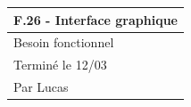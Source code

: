 \documentclass[a4paper,12pt]{article}
\begin{document}
\noindent
\setlength{\arrayrulewidth}{1.5pt}
\renewcommand{\arraystretch}{1.5}
\begin{tabularx}{\textwidth}{|X|}
    \hline
    \textbf{F.26 - Interface graphique}                                                                                                                                                                                                                                                                                                                                                                                                                                                                                                                                                                                         \\
    \hline
    Besoin fonctionnel                                                                                                                                                                                                                                                                                                                                                                                                                                                                                                                                                                                                          \\
    \hline
    Terminé le 12/03                                                                                                                                                                                                                                                                                                                                                                                                                                                                                                                                                                                                            \\
    Par Lucas                                                                                                                                                                                                                                                                                                                                                                                                                                                                                                                                                                                                                   \\

\end{tabularx}
\end{document}
